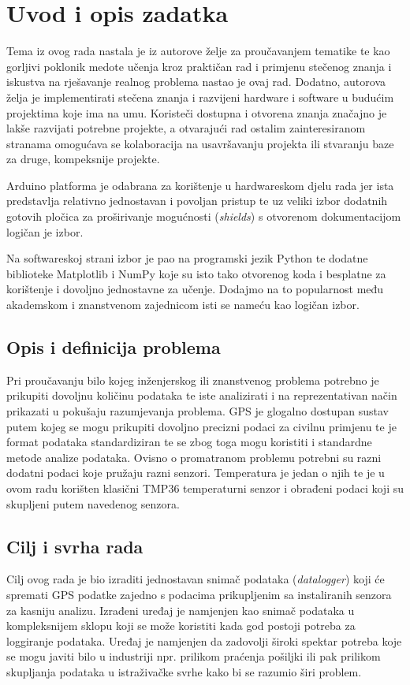 \chapter{Uvod i opis zadatka}\label{OpisIOgranicenja}
Tema iz ovog rada nastala je iz autorove želje za proučavanjem tematike te kao gorljivi poklonik medote učenja kroz praktičan rad i primjenu stečenog znanja i iskustva na rješavanje realnog problema nastao je ovaj rad.
Dodatno, autorova želja je implementirati stečena znanja i razvijeni hardware i software u budućim projektima koje ima na umu.
Koristeči dostupna i otvorena znanja značajno je lakše razvijati potrebne projekte, a otvarajući rad ostalim zainteresiranom stranama omogućava se kolaboracija na usavršavanju projekta ili stvaranju baze za druge, kompeksnije projekte.

Arduino platforma je odabrana za korištenje u hardwareskom djelu rada jer ista predstavlja relativno jednostavan i povoljan pristup te uz veliki izbor dodatnih gotovih pločica za proširivanje mogućnosti (\textit{shields}) s otvorenom dokumentacijom logičan je izbor.

Na softwareskoj strani izbor je pao na programski jezik Python te dodatne biblioteke Matplotlib i NumPy koje su isto tako otvorenog koda i besplatne za korištenje i dovoljno jednostavne za učenje.
Dodajmo na to popularnost među akademskom i znanstvenom zajednicom isti se nameću kao logičan izbor.

\section{Opis i definicija problema}
Pri proučavanju bilo kojeg inženjerskog ili znanstvenog problema potrebno je prikupiti dovoljnu količinu podataka te iste analizirati i na reprezentativan način prikazati u pokušaju razumjevanja problema.
GPS je glogalno dostupan sustav putem kojeg se mogu prikupiti dovoljno precizni podaci za civilnu primjenu te je format podataka standardiziran te se zbog toga mogu koristiti i standardne metode analize podataka.
Ovisno o promatranom problemu potrebni su razni dodatni podaci koje pružaju razni senzori.
Temperatura je jedan o njih te je u ovom radu korišten klasični TMP36 temperaturni senzor i obrađeni podaci koji su skupljeni putem navedenog senzora.

\section{Cilj i svrha rada}
Cilj ovog rada je bio izraditi jednostavan snimač podataka (\textit{datalogger}) koji će spremati GPS podatke zajedno s podacima prikupljenim sa instaliranih senzora za kasniju analizu.
Izrađeni uređaj je namjenjen kao snimač podataka u kompleksnijem sklopu koji se može koristiti kada god postoji potreba za loggiranje podataka.
Uređaj je namjenjen da zadovolji široki spektar potreba koje se mogu javiti bilo u industriji npr. prilikom praćenja pošiljki ili pak prilikom skupljanja podataka u istraživačke svrhe kako bi se razumio širi problem.


